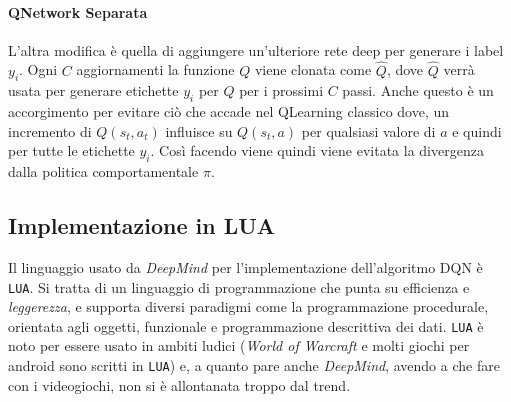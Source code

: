 \documentclass[twoside,twocolumn,10pt]{extarticle}
\theoremstyle{definition}
\begin{document}
		\paragraph*{Q\texttwelveudash Network Separata} L'altra modifica è quella di aggiungere un'ulteriore rete deep per generare i label $y_i$. Ogni $C$ aggiornamenti la funzione $Q$ viene clonata come $\hat{Q}$, dove $\hat{Q}$ verrà usata per generare etichette $y_i$ per $Q$ per i prossimi $C$ passi. Anche questo è un accorgimento per evitare ciò che accade nel Q\texttwelveudash Learning classico dove, un incremento di $Q(s_t, a_t)$ influisce su $Q(s_t, a)$ per qualsiasi valore di $a$ e quindi per tutte le etichette $y_i$. Così facendo viene quindi viene evitata la divergenza dalla politica comportamentale $\pi$.
		
	\subsection{Implementazione in LUA}
		Il linguaggio usato da \textit{DeepMind} per l'implementazione dell'algoritmo DQN è \texttt{LUA}. Si tratta di un linguaggio di programmazione che punta su efficienza e \textit{leggerezza}, e supporta diversi paradigmi come la programmazione procedurale, orientata agli oggetti, funzionale e programmazione descrittiva dei dati. \texttt{LUA} è noto per essere usato in ambiti ludici (\textit{World of Warcraft} e molti giochi per android sono scritti in \texttt{LUA}) e, a quanto pare anche \textit{DeepMind}, avendo a che fare con i videogiochi, non si è allontanata troppo dal trend.
		
\end{document}
